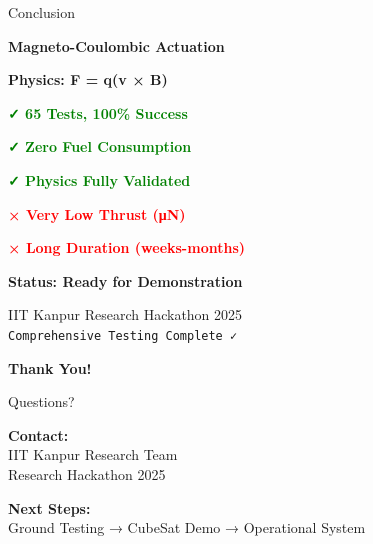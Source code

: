 \documentclass[aspectratio=169]{beamer}
\begin{document}
\begin{frame}{Conclusion}
\begin{center}
\LARGE\textbf{Magneto-Coulombic Actuation}

\vspace{1em}

\Large\textbf{Physics: F = q(v × B)}

\vspace{2em}

\textcolor{green}{\textbf{✓ 65 Tests, 100\% Success}}

\textcolor{green}{\textbf{✓ Zero Fuel Consumption}}

\textcolor{green}{\textbf{✓ Physics Fully Validated}}

\vspace{1em}

\textcolor{red}{\textbf{× Very Low Thrust (μN)}}

\textcolor{red}{\textbf{× Long Duration (weeks-months)}}

\vspace{2em}

\textbf{Status: Ready for Demonstration}

\vspace{1em}

\normalsize
IIT Kanpur Research Hackathon 2025\\
\texttt{Comprehensive Testing Complete ✓}
\end{center}
\end{frame}

\begin{frame}
\begin{center}
\Huge\textbf{Thank You!}

\vspace{2em}

\Large Questions?

\vspace{2em}

\normalsize
\textbf{Contact:}\\
IIT Kanpur Research Team\\
Research Hackathon 2025

\vspace{1em}

\textbf{Next Steps:}\\
Ground Testing → CubeSat Demo → Operational System
\end{center}
\end{frame}
\end{document}
